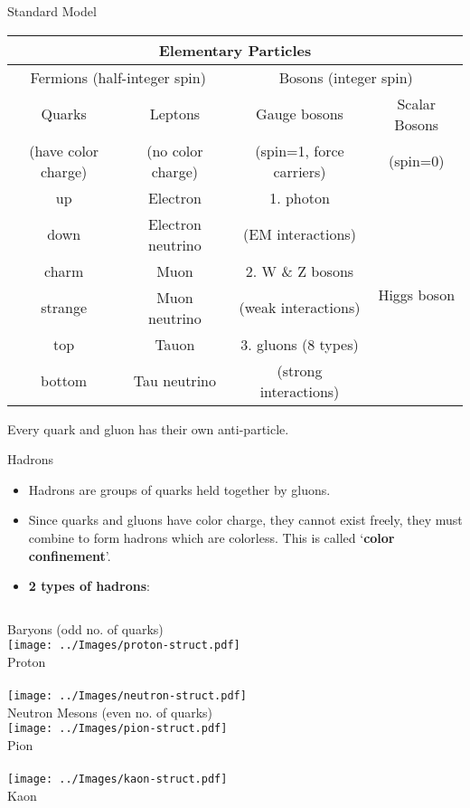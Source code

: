 \documentclass{beamer}
\begin{document}
\begin{frame}{Standard Model}
	\renewcommand{\arraystretch}{1.5}
	\begin{table}\tiny
	\begin{tabular}{|c|c|c|c|}
		\hline
		\multicolumn{4}{|c|}{Elementary Particles}\\
		\hline
		\multicolumn{2}{|c|}{Fermions (half-integer spin)} & \multicolumn{2}{|c|}{Bosons (integer spin)}\\
		\hline
		Quarks & Leptons & Gauge bosons & Scalar Bosons\\
		(have color charge) & (no color charge) & (spin=1, force carriers) & (spin=0)\\
		\hline
		up & Electron & 1. photon & \multirow{6}{*}{Higgs boson} \\
		down & Electron neutrino & (EM interactions) &\\
		charm & Muon & 2. W \& Z bosons &\\
		strange & Muon neutrino & (weak interactions) &\\
		top & Tauon & 3. gluons (8 types) &\\
		bottom & Tau neutrino & (strong interactions) &\\
		\hline
	\end{tabular}
	\end{table}
Every quark and gluon has their own anti-particle.
\end{frame}
\begin{frame}{Hadrons}
	\begin{itemize}
		\item Hadrons are groups of quarks held together by gluons.
		\item Since quarks and gluons have color charge, they cannot exist freely, they must combine to form hadrons which are colorless. This is called `\textbf{color confinement}'. 
		\item \textbf{2 types of hadrons}:
	\end{itemize}
\begin{columns}
	\centering
	Baryons (odd no. of quarks)\\\scriptsize
	\texttt{[image: ../Images/proton-struct.pdf]}\\
	Proton\\~\\
	\texttt{[image: ../Images/neutron-struct.pdf]}\\
	Neutron
	\centering
	Mesons (even no. of quarks)\\\scriptsize
	\texttt{[image: ../Images/pion-struct.pdf]}\\
	Pion\\~\\
	\texttt{[image: ../Images/kaon-struct.pdf]}\\
	Kaon
\end{columns}
\end{frame}
\end{document}
